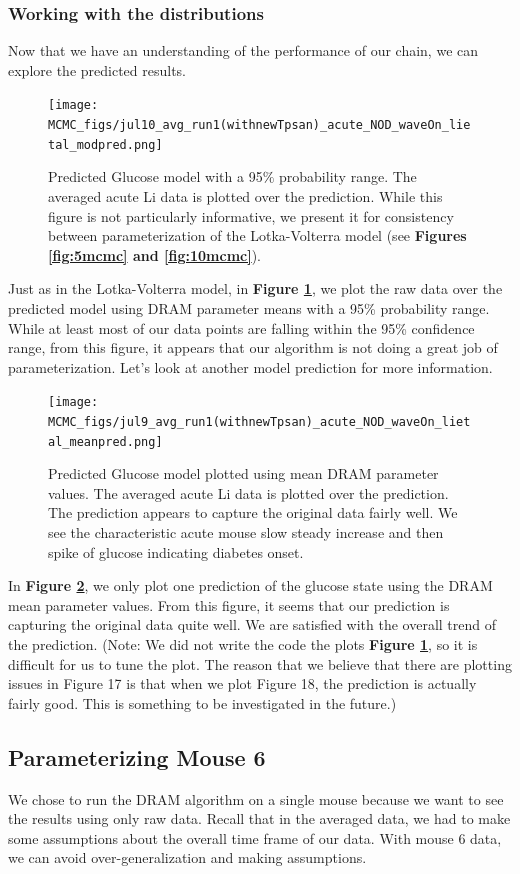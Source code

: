 \documentclass{article}
\begin{document}
\subsubsection{Working with the distributions}
Now that we have an understanding of the performance of our chain, we can explore the predicted results.
\begin{figure}[H]
    \centering
    \texttt{[image: MCMC\_figs/jul10\_avg\_run1(withnewTpsan)\_acute\_NOD\_waveOn\_lietal\_modpred.png]}
    \caption{Predicted Glucose model with a 95$\%$ probability range. The averaged acute Li data is plotted over the prediction. While this figure is not particularly informative, we present it for consistency between parameterization of the Lotka-Volterra model (see \textbf{Figures \ref{fig:5mcmc} and \ref{fig:10mcmc}}).}
    \label{fig:16mcmc}
\end{figure}
Just as in the Lotka-Volterra model, in \textbf{Figure \ref{fig:16mcmc}}, we plot the raw data over the predicted model using DRAM parameter means with a 95\% probability range. While at least most of our data points are falling within the 95\% confidence range, from this figure, it appears that our algorithm is not doing a great job of parameterization. Let's look at another model prediction for more information.
\begin{figure}[H]
    \centering
    \texttt{[image: MCMC\_figs/jul9\_avg\_run1(withnewTpsan)\_acute\_NOD\_waveOn\_lietal\_meanpred.png]}
    \caption{Predicted Glucose model plotted using mean DRAM parameter values. The averaged acute Li data is plotted over the prediction. The prediction appears to capture the original data fairly well. We see the characteristic acute mouse slow steady increase and then spike of glucose indicating diabetes onset.}
    \label{fig:17mcmc}
\end{figure}
In \textbf{Figure \ref{fig:17mcmc}}, we only plot one prediction of the glucose state using the DRAM mean parameter values. From this figure, it seems that our prediction is capturing the original data quite well. We are satisfied with the overall trend of the prediction. (Note: We did not write the code the plots \textbf{Figure \ref{fig:16mcmc}}, so it is difficult for us to tune the plot. The reason that we believe that there are plotting issues in Figure 17 is that when we plot Figure 18, the prediction is actually fairly good. This is something to be investigated in the future.)
\subsection{Parameterizing Mouse 6}
We chose to run the DRAM algorithm on a single mouse because we want to see the results using only raw data. Recall that in the averaged data, we had to make some assumptions about the overall time frame of our data. With mouse 6 data, we can avoid over-generalization and making assumptions. 
\end{document}
